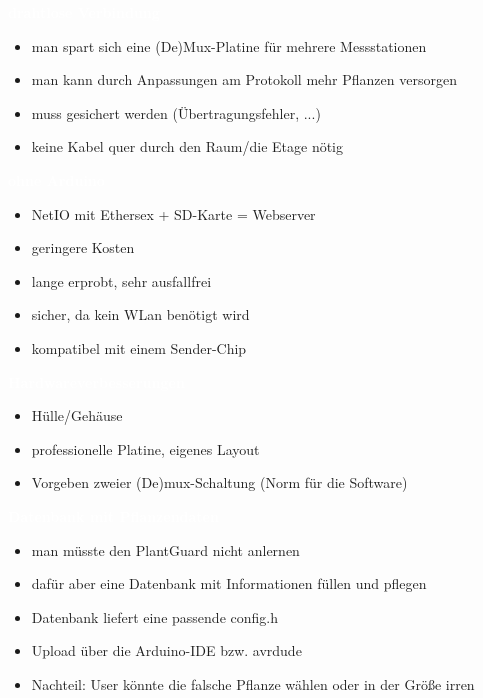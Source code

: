 \documentclass[bigger]{beamer}
\newcommand{\topic}[1]{{\huge{\textcolor{white}{\textbf{#1}}}}}
\begin{document}
\begin{frame}{\topic{drahtlose Verbindung}}
	\begin{itemize}
		\item man spart sich eine (De)Mux-Platine für mehrere Messstationen
		\item man kann durch Anpassungen am Protokoll mehr Pflanzen versorgen
		\item muss gesichert werden (Übertragungsfehler, ...)
		\item keine Kabel quer durch den Raum/die Etage nötig
	\end{itemize}
\end{frame}

\begin{frame}{\topic{ohne Arduino}}
	\begin{itemize}
		\item NetIO mit Ethersex + SD-Karte = Webserver
		\item geringere Kosten
		\item lange erprobt, sehr ausfallfrei
		\item sicher, da kein WLan benötigt wird
		\item kompatibel mit einem Sender-Chip
	\end{itemize}
\end{frame}

\begin{frame}{\topic{Hardwareverbesserungen}}
	\begin{itemize}
		\item Hülle/Gehäuse
		\item professionelle Platine, eigenes Layout
		\item Vorgeben zweier (De)mux-Schaltung (Norm für die Software)
	\end{itemize}
\end{frame}

\begin{frame}{\topic{Datenbank mit Pflanzendaten}}
	\begin{itemize}
		\item man müsste den PlantGuard nicht anlernen
		\item dafür aber eine Datenbank mit Informationen füllen und pflegen
		\item Datenbank liefert eine passende config.h
		\item Upload über die Arduino-IDE bzw. avrdude
		\item Nachteil: User könnte die falsche Pflanze wählen oder in der Größe irren
	\end{itemize}
\end{frame}
\end{document}
